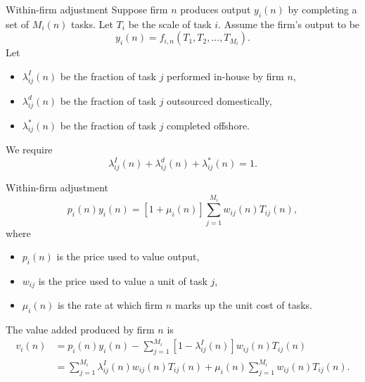 \documentclass{beamer}
\begin{document}
\begin{frame}{Within-firm adjustment}
	Suppose firm $n$ produces output $y_i(n)$ by completing a set of $M_i(n)$ tasks. Let $T_i$ be the scale of task $i$. Assume the firm's output to be
	\begin{equation}
		y_i(n)=f_{i,n}(T_1,T_2,...,T_{M_i}).
	\end{equation}
	Let
	\begin{itemize}
		\item $\lambda_{ij}^I(n)$ be the fraction of task $j$ performed in-house by firm $n$,
		\item $\lambda_{ij}^d(n)$ be the fraction of task $j$ outsourced domestically,
		\item $\lambda_{ij}^*(n)$ be the fraction of task $j$ completed offshore.
	\end{itemize}
	\medskip
	We require
	\begin{equation}
		\lambda_{ij}^I(n) + \lambda_{ij}^d(n) + \lambda_{ij}^*(n) = 1.
	\end{equation}
\end{frame}
\begin{frame}{Within-firm adjustment}
	\begin{equation}
		p_i(n)y_i(n)=[1+\mu_i(n)]\sum_{j=1}^{M_i} w_{ij}(n)T_{ij}(n),
	\end{equation}
	where
	\begin{itemize}
		\item $p_i(n)$ is the price used to value output,
		\item $w_{ij}$ is the price used to value a unit of task $j$,
		\item $\mu_i(n)$ is the rate at which firm $n$ marks up the unit cost of tasks.
	\end{itemize}
	\medskip
	The value added produced by firm $n$ is
	\begin{equation}
		\begin{aligned}
			v_i(n)&=p_i(n)y_i(n)-\sum_{j=1}^{M_i}[1-\lambda_{ij}^I(n)]w_{ij}(n)T_{ij}(n) \\
			&=\sum_{j=1}^{M_i}\lambda_{ij}^I(n)w_{ij}(n)T_{ij}(n) + \mu_i(n)\sum_{j=1}^{M_i}w_{ij}(n)T_{ij}(n).
		\end{aligned}
	\end{equation}
\end{frame}
\end{document}
